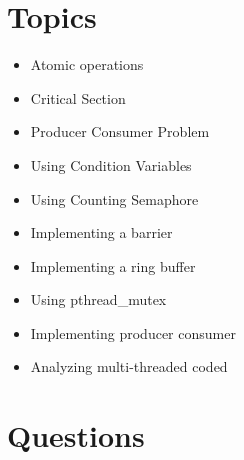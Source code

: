 \section{Topics}\label{topics}

\begin{itemize}
\tightlist
\item
  Atomic operations
\item
  Critical Section
\item
  Producer Consumer Problem
\item
  Using Condition Variables
\item
  Using Counting Semaphore
\item
  Implementing a barrier
\item
  Implementing a ring buffer
\item
  Using pthread\_mutex
\item
  Implementing producer consumer
\item
  Analyzing multi-threaded coded
\end{itemize}

\section{Questions}\label{questions}

